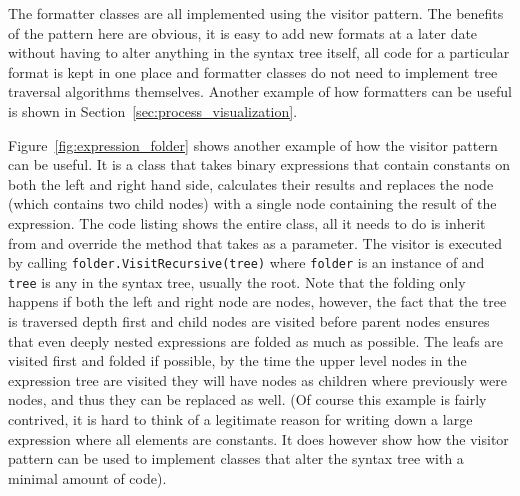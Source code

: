   The formatter classes are all implemented using the visitor pattern. The 
  benefits of the pattern here are obvious, it is easy to add new formats at a 
  later date without having to alter anything in the syntax tree itself, all 
  code for a particular format is kept in one place and formatter classes do 
  not need to implement tree traversal algorithms themselves. Another example
  of how formatters can be useful is shown in Section~\ref{sec:process_visualization}.

	Figure~\ref{fig:expression_folder} shows another example of how the 
	visitor pattern can be useful. It is a class that takes binary 
	expressions that contain constants on both the left and right hand side, 
	calculates their results and replaces the  
	node (which contains two child nodes) with a single  node 
	containing the result of the expression. The code listing shows the entire 
	 class, all it needs to do is inherit from 
	 and override the  method that takes 
	 as a parameter. The visitor is executed 
	by calling \texttt{folder.VisitRecursive(tree)} where \texttt{folder} is an 
	instance of  and \texttt{tree} is any  
	in the syntax tree, usually the root. Note that the folding only happens if 
	both the left and right node are  nodes, however, the fact 
	that the tree is traversed depth first and child nodes are visited before 
	parent nodes ensures that even deeply nested expressions are folded as much 
	as possible. The leafs are visited first and folded if possible, by the time 
	the upper level nodes in the expression tree are visited they will have 
	 nodes as children where previously were
	 nodes, and thus they can be replaced 
	as well. (Of course this example is fairly contrived, it is hard to think of
	a legitimate reason for writing down a large expression where all elements
	are constants. It does however show how the visitor pattern can be used to 
	implement classes that alter the syntax tree with a minimal amount of code).
	
